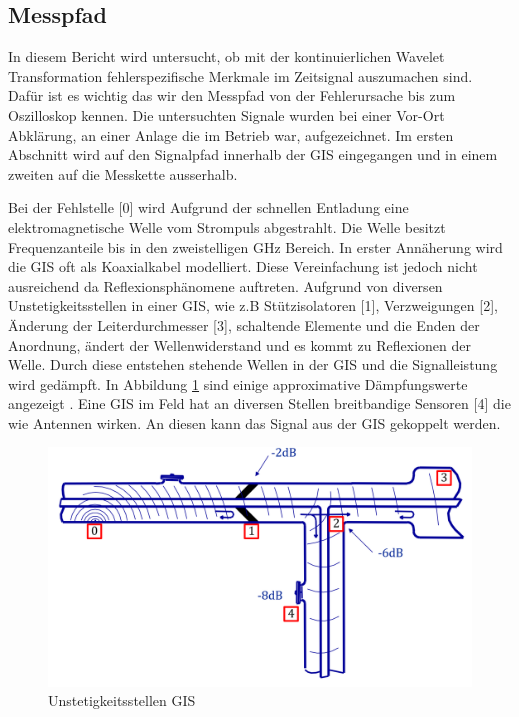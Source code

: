\begin{refsection}
\section{Messpfad}
In diesem Bericht wird untersucht, ob mit der kontinuierlichen Wavelet Transformation fehlerspezifische Merkmale im Zeitsignal auszumachen sind. 
Dafür ist es wichtig das wir den Messpfad von der Fehlerursache bis zum Oszilloskop kennen. 
Die untersuchten Signale wurden bei einer Vor-Ort Abklärung, an einer Anlage die im Betrieb war, aufgezeichnet.  
Im ersten Abschnitt wird auf den Signalpfad innerhalb der GIS eingegangen und in einem zweiten auf die Messkette ausserhalb.

Bei der Fehlstelle [0] wird Aufgrund der schnellen Entladung eine elektromagnetische  Welle vom Strompuls abgestrahlt. 
Die Welle besitzt Frequenzanteile bis in den zweistelligen GHz Bereich. 
In erster Annäherung wird die GIS oft als Koaxialkabel modelliert. 
Diese Vereinfachung ist jedoch nicht ausreichend da Reflexionsphänomene auftreten. 
Aufgrund von diversen Unstetigkeitsstellen in einer GIS, wie z.B Stützisolatoren [1], Verzweigungen [2],  Änderung der Leiterdurchmesser [3], schaltende Elemente und die Enden der Anordnung, ändert der Wellenwiderstand und es kommt zu Reflexionen der Welle.
Durch diese entstehen stehende Wellen in der GIS und die Signalleistung wird gedämpft. 
In Abbildung \ref{fig:messketteingis} sind einige approximative Dämpfungswerte angezeigt \cite{report:PDBasicABB}.
Eine GIS im Feld hat an diversen Stellen breitbandige Sensoren [4] die wie Antennen wirken. 
An diesen kann das Signal aus der GIS gekoppelt werden. \cite{buch:UHFSignale, skript:Judd24ps, buch:Kuchler} 
\begin{figure}
	\centering
	\includegraphics[width=0.5\linewidth]{papers/gis/Bilder/MessketteInGIS}
	\caption{Unstetigkeitsstellen GIS \cite{report:PDBasicABB}}
	\label{fig:messketteingis}
\end{figure}


\end{refsection}
